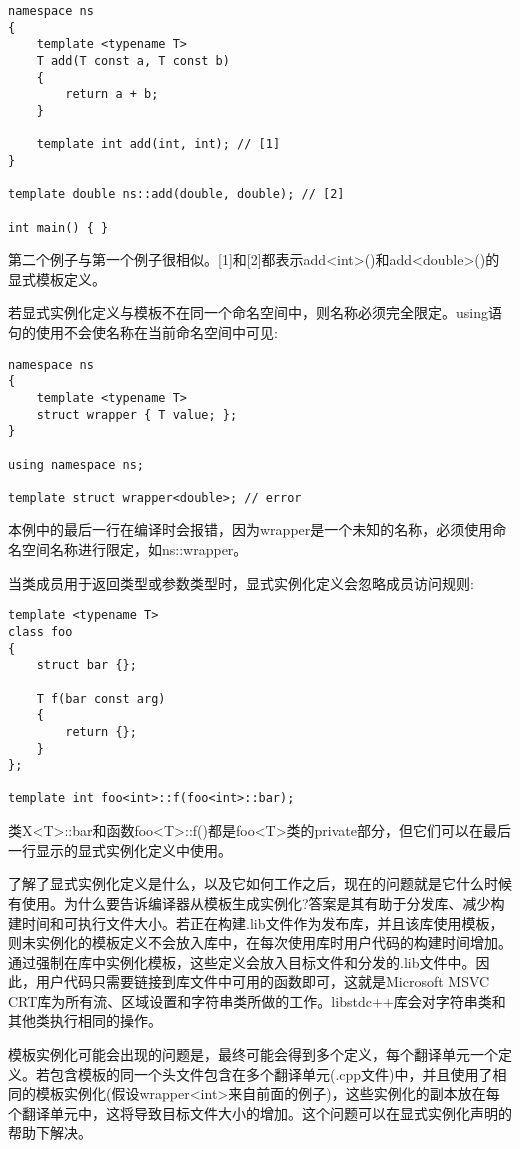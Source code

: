 \begin{lstlisting}[style=styleCXX]
namespace ns
{
	template <typename T>
	T add(T const a, T const b)
	{
		return a + b;
	}

	template int add(int, int); // [1]
}

template double ns::add(double, double); // [2]

int main() { }
\end{lstlisting}

第二个例子与第一个例子很相似。[1]和[2]都表示add<int>()和add<double>()的显式模板定义。

若显式实例化定义与模板不在同一个命名空间中，则名称必须完全限定。using语句的使用不会使名称在当前命名空间中可见:

\begin{lstlisting}[style=styleCXX]
namespace ns
{
	template <typename T>
	struct wrapper { T value; };
}

using namespace ns;

template struct wrapper<double>; // error
\end{lstlisting}

本例中的最后一行在编译时会报错，因为wrapper是一个未知的名称，必须使用命名空间名称进行限定，如ns::wrapper。

当类成员用于返回类型或参数类型时，显式实例化定义会忽略成员访问规则:

\begin{lstlisting}[style=styleCXX]
template <typename T>
class foo
{
	struct bar {};
	
	T f(bar const arg)
	{
		return {};
	}
};

template int foo<int>::f(foo<int>::bar);
\end{lstlisting}

类X<T>::bar和函数foo<T>::f()都是foo<T>类的private部分，但它们可以在最后一行显示的显式实例化定义中使用。

了解了显式实例化定义是什么，以及它如何工作之后，现在的问题就是它什么时候有使用。为什么要告诉编译器从模板生成实例化?答案是其有助于分发库、减少构建时间和可执行文件大小。若正在构建.lib文件作为发布库，并且该库使用模板，则未实例化的模板定义不会放入库中，在每次使用库时用户代码的构建时间增加。通过强制在库中实例化模板，这些定义会放入目标文件和分发的.lib文件中。因此，用户代码只需要链接到库文件中可用的函数即可，这就是Microsoft MSVC CRT库为所有流、区域设置和字符串类所做的工作。libstdc++库会对字符串类和其他类执行相同的操作。

模板实例化可能会出现的问题是，最终可能会得到多个定义，每个翻译单元一个定义。若包含模板的同一个头文件包含在多个翻译单元(.cpp文件)中，并且使用了相同的模板实例化(假设wrapper<int>来自前面的例子)，这些实例化的副本放在每个翻译单元中，这将导致目标文件大小的增加。这个问题可以在显式实例化声明的帮助下解决。

